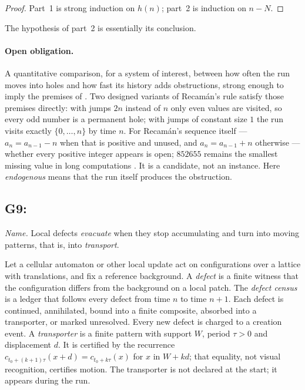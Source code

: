 \begin{proof}
Part~1 is strong induction on $h(n)$; part~2 is induction on $n - N$.
\end{proof}

The hypothesis of part~2 is essentially its conclusion.

\paragraph{Open obligation.} A quantitative comparison, for a system of interest, between how often
the run moves into holes and how fast its history adds obstructions, strong enough to imply the
premises of . Two designed variants of Recam\'an's rule satisfy those premises
directly: with jumps $2n$ instead of $n$ only even values are visited, so every odd number is a
permanent hole; with jumps of constant size $1$ the run visits exactly $\{0, \ldots, n\}$ by time
$n$. For Recam\'an's sequence itself --- $a_n = a_{n-1} - n$ when that is positive and unused, and
$a_n = a_{n-1} + n$ otherwise --- whether every positive integer appears is open; $852655$ remains
the smallest missing value in long computations \citep{OEIS-A005132,OEIS-A057167}. It is a
candidate, not an instance. Here \emph{endogenous} means that the run itself produces the
obstruction.

\subsection{G9: \lawGNine}\label{sec:G9}

\emph{Name.} Local defects \emph{evacuate} when they stop accumulating and turn into moving
patterns, that is, into \emph{transport}.

Let a cellular automaton or other local update act on configurations over a lattice with
translations, and fix a reference background. A \emph{defect} is a finite witness that the
configuration differs from the background on a local patch. The \emph{defect census} is a ledger
that follows every defect from time $n$ to time $n+1$. Each defect is continued, annihilated, bound
into a finite composite, absorbed into a transporter, or marked unresolved. Every new defect is
charged to a creation event. A \emph{transporter} is a finite pattern with support $W$, period
$\tau > 0$ and displacement $d$. It is certified by the recurrence $c_{t_0 + (k+1)\tau}(x + d) =
c_{t_0 + k\tau}(x)$ for $x$ in $W + kd$; that equality, not visual recognition, certifies motion.
The transporter is not declared at the start; it appears during the run.

